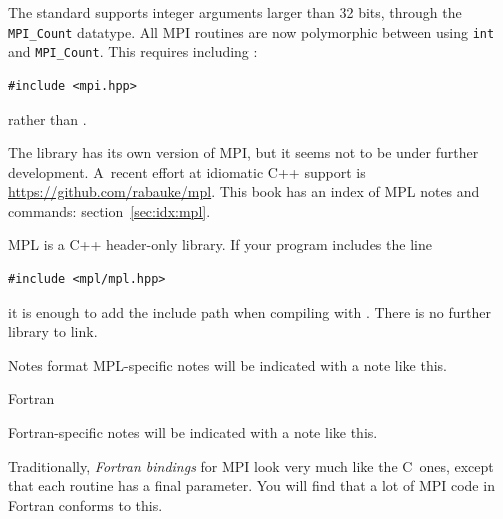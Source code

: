 \begin{mpifour}
  The  standard supports integer arguments larger than 32 bits,
  through the \lstinline+MPI_Count+ datatype.
  All MPI routines are now polymorphic between using
  \lstinline+int+ and \lstinline+MPI_Count+.
  This requires including :
\begin{verbatim}
#include <mpi.hpp>
\end{verbatim}
  rather than .
\end{mpifour}

The  library has its own version of MPI, but it seems
not to be under further development.  A~recent
effort at idiomatic C++ support is 
\url{https://github.com/rabauke/mpl}.
This book has an index of \ac{MPL} notes and commands:
section~\ref{sec:idx:mpl}.

MPL
is a C++ header-only library. If your program includes the line
\begin{lstlisting}
#include <mpl/mpl.hpp>
\end{lstlisting}
it is enough to add the include path when compiling with .
There is no further library to link.

\begin{mplnote}{Notes format}
  MPL-specific notes will be indicated with a note like this.
\end{mplnote}


 {Fortran}

\begin{fortrannote}
  Fortran-specific notes will be indicated with a note like this.
\end{fortrannote}

Traditionally, \emph{Fortran bindings} for MPI look very much like the C~ones,
except that each routine has a final 
parameter.
You will find that a lot of MPI code in Fortran conforms to this.

